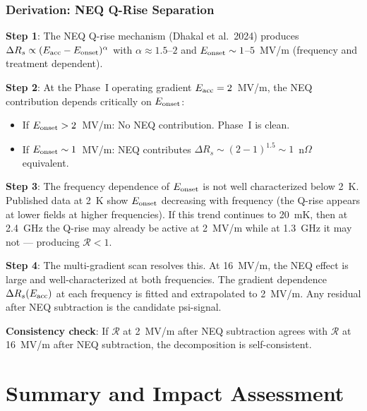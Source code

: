 \documentclass[11pt]{article}
\theoremstyle{definition}
\theoremstyle{remark}
\begin{document}
\section{Derivation: NEQ Q-Rise Separation}
\label{sec:neq_derivation}

\textbf{Step 1}: The NEQ Q-rise mechanism (Dhakal et al.\ 2024)
produces $\Delta R_s \propto (E_{\rm acc} - E_{\rm onset})^\alpha$
with $\alpha \approx 1.5$--$2$ and $E_{\rm onset} \sim 1$--$5$~MV/m
(frequency and treatment dependent).

\textbf{Step 2}: At the Phase~I operating gradient $E_{\rm acc} = 2$~MV/m,
the NEQ contribution depends critically on $E_{\rm onset}$:
\begin{itemize}[nosep]
\item If $E_{\rm onset} > 2$~MV/m: No NEQ contribution. Phase~I is clean.
\item If $E_{\rm onset} \sim 1$~MV/m: NEQ contributes
  $\Delta R_s \sim (2-1)^{1.5} \sim 1$~n$\Omega$ equivalent.
\end{itemize}

\textbf{Step 3}: The frequency dependence of $E_{\rm onset}$ is
not well characterized below 2~K. Published data at 2~K show
$E_{\rm onset}$ decreasing with frequency (the Q-rise appears at
lower fields at higher frequencies). If this trend continues to
20~mK, then at 2.4~GHz the Q-rise may already be active at 2~MV/m
while at 1.3~GHz it may not --- producing $\mathcal{R} < 1$.

\textbf{Step 4}: The multi-gradient scan resolves this. At 16~MV/m,
the NEQ effect is large and well-characterized at both frequencies.
The gradient dependence $\Delta R_s(E_{\rm acc})$ at each frequency
is fitted and extrapolated to 2~MV/m. Any residual after NEQ
subtraction is the candidate psi-signal.

\textbf{Consistency check}: If $\mathcal{R}$ at 2~MV/m after NEQ
subtraction agrees with $\mathcal{R}$ at 16~MV/m after NEQ
subtraction, the decomposition is self-consistent.


\part{Summary and Impact Assessment}
\label{part:summary}
\end{document}
